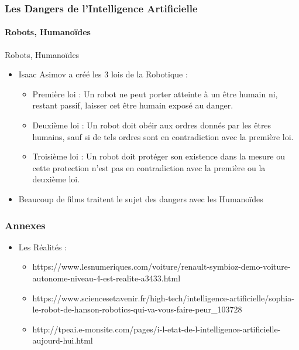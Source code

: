 \documentclass{beamer}
\begin{document}
		\begin{frame}[fragile]
	\frametitle{Les Dangers de l'Intelligence Artificielle}
	\framesubtitle{Robots, Humanoïdes}
	\begin{block}{Robots, Humanoïdes}
	\begin{itemize}
	\itemsep1em
		\item Isaac Asimov a créé les 3 lois de la Robotique :
		\begin{itemize}
		\itemsep1em
			\item Première loi : Un robot ne peut porter atteinte à un être humain ni, restant passif, laisser cet être humain exposé au danger.
			\item Deuxième loi : Un robot doit obéir aux ordres donnés par les êtres humains, sauf si de tels ordres sont en contradiction avec la première loi.
			\item Troisième loi : Un robot doit protéger son existence dans la mesure ou cette protection n'est pas en contradiction avec la première ou la deuxième loi.
		\end{itemize}
		\item Beaucoup de films traitent le sujet des dangers avec les Humanoïdes
	\end{itemize}
	\end{block}
	\end{frame}
	
	\begin{frame}[fragile]
	\frametitle{Annexes}
	\begin{itemize}
	\itemsep1em
		\item Les Réalités :
		\begin{itemize}
		\itemsep1em
			\item https://www.lesnumeriques.com/voiture/renault-symbioz-demo-voiture-autonome-niveau-4-est-realite-a3433.html
			\item https://www.sciencesetavenir.fr/high-tech/intelligence-artificielle/sophia-le-robot-de-hanson-robotics-qui-va-vous-faire-peur\_103728
			\item http://tpeai.e-monsite.com/pages/i-l-etat-de-l-intelligence-artificielle-aujourd-hui.html
		\end{itemize}
		\end{itemize}
	\end{frame}	
		
\end{document}
